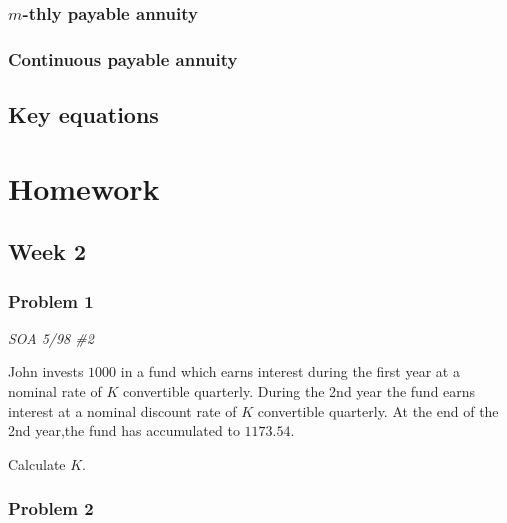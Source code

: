 \documentclass[
]{book}
\begin{document}
\hypertarget{m-thly-payable-annuity}{%
\subsection*{\texorpdfstring{\(m\)-thly payable annuity}{m-thly payable annuity}}\label{m-thly-payable-annuity}}

\hypertarget{continuous-payable-annuity}{%
\subsection*{Continuous payable annuity}\label{continuous-payable-annuity}}

\hypertarget{key-equations}{%
\section{Key equations}\label{key-equations}}

\hypertarget{homework}{%
\chapter*{Homework}\label{homework}}

\hypertarget{week-2}{%
\section*{Week 2}\label{week-2}}

\hypertarget{problem-1}{%
\subsection*{Problem 1}\label{problem-1}}

\emph{SOA 5/98 \#2}

John invests \(1000\) in a fund which earns interest during the first year at a nominal rate of \(K\) convertible quarterly. During the 2nd year the fund earns interest at a nominal discount rate of \(K\) convertible quarterly. At the end of the 2nd year,the fund has accumulated to \(1173.54\).

Calculate \(K\).

\hypertarget{problem-2}{%
\subsection*{Problem 2}\label{problem-2}}
\end{document}
